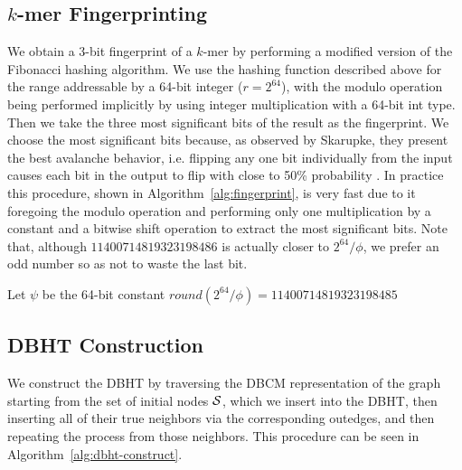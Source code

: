 \documentclass[a4paper,12pt]{article}
\newcommand{\dBCM}{DBCM\xspace}
\newcommand{\dBHT}{DBHT\xspace}
\newcommand{\kmer}{\mbox{$k$-mer}\xspace}
\newcommand{\strsetname}[1]{\ensuremath{\mathcal{\uppercase{#1}}}}
\begin{document}
\subsection{\kmer Fingerprinting}\label{sec:fingerprint}

We obtain a 3-bit fingerprint of a \kmer by performing a modified version of the Fibonacci hashing algorithm. We use the hashing function described above for the range addressable by a 64-bit integer ($r=2^{64}$), with the modulo operation being performed implicitly by using integer multiplication with a 64-bit int type. Then we take the three most significant bits of the result as the fingerprint. We choose the most significant bits because, as observed by Skarupke, they present the best avalanche behavior, i.e. flipping any one bit individually from the input causes each bit in the output to flip with close to 50\% probability \cite{Skarupke2018}. In practice this procedure, shown in Algorithm~\ref{alg:fingerprint}, is very fast due to it foregoing the modulo operation and performing only one multiplication by a constant and a bitwise shift operation to extract the most significant bits. Note that, although $11400714819323198486$ is actually closer to $2^{64}/\phi$, we prefer an odd number so as not to waste the last bit.

\begin{algorithm}
	\caption{$\mathit{fingerprint(X)}$}\label{alg:fingerprint}
	Let $\psi$ be the 64-bit constant $\mathit{round}({2^{64}}/{\phi})=11400714819323198485$\\
	
\end{algorithm}

\subsection{\dBHT Construction}
\label{subsubsec:dbht-construction}

We construct the \dBHT by traversing the \dBCM representation of the graph starting from the set of initial nodes $\strsetname{S}$, which we insert into the \dBHT, then inserting all of their true neighbors via the corresponding outedges, and then repeating the process from those neighbors. This procedure can be seen in Algorithm~\ref{alg:dbht-construct}.
\end{document}

